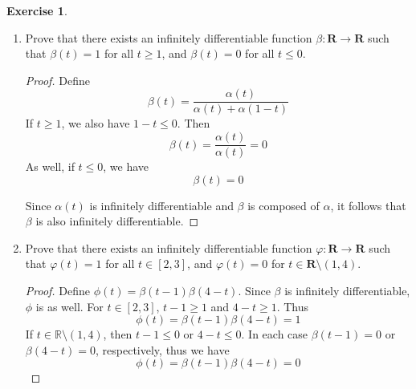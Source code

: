 \documentclass{article}
\newcommand{\R}{\mathbf{R}}
\theoremstyle{plain} %
\numberwithin{thm}{section} %
\theoremstyle{definition}
\newtheorem{exercise}[thm]{Exercise} %
\begin{document}
\begin{exercise}
\begin{enumerate}[label=(\alph*)]
\begin{proof}
            \end{proof}
    
            \item Prove that there exists an infinitely differentiable function $\beta:\R\rightarrow \R$ such that $\beta(t)=1$ for all $t\geq 1$, and $\beta(t)=0$ for all $t\leq 0$.
    
            \begin{proof}
                Define
                \[
                    \beta (t) = \frac{\alpha (t)}{\alpha (t) + \alpha (1-t)}
                \] 
                If \(t\geq 1\), we also have \(1-t \leq 0\). Then
                \[
                    \beta (t) = \frac{\alpha (t)}{\alpha (t)} = 0
                \]
                As well, if \(t \leq 0\), we have
                \[
                    \beta (t) = 0
                \]

                Since \(\alpha(t)\) is infinitely differentiable and \(\beta\) is composed of \(\alpha \), it follows that \(\beta\) is also infinitely differentiable.

            \end{proof}
    
            \item Prove that there exists an infinitely differentiable function $\varphi:\R\rightarrow \R$ such that $\varphi(t)=1$ for all $t\in [2,3]$, and $\varphi(t)=0$ for $t\in \R\setminus (1,4)$.
    
            \begin{proof}
                Define \(\phi (t) = \beta (t-1) \beta (4-t)\).
                Since \(\beta\) is infinitely differentiable, \(\phi\) is as well. For \(t \in [2,3]\), \(t-1 \geq 1\) and \(4-t \geq 1\). Thus
                \[
                    \phi (t) = \beta(t-1) \beta (4-t) = 1
                \]
                If \(t \in \mathbb{R} \setminus (1,4)\), then \(t-1 \leq 0\) or \(4-t \leq 0\). In each case \(\beta(t-1) = 0\) or \(\beta (4-t) = 0\), respectively, thus we have
                \[
                    \phi (t) = \beta (t-1) \beta (4-t) = 0
                \]

            \end{proof}
        \end{enumerate}
    \end{exercise}
    \pagebreak
\end{document}
